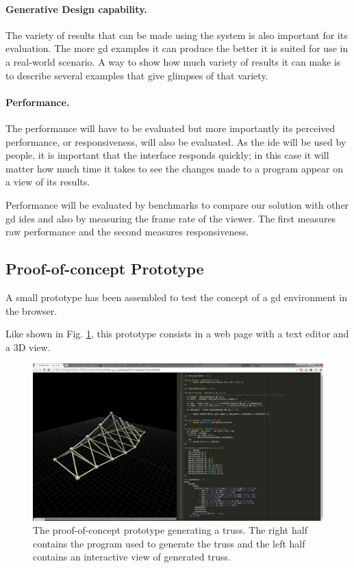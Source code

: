 \documentclass{./llncs2e/llncs}
\begin{document}
	\paragraph{Generative Design capability.}
	The variety of results that can be made using the system is also important for its evaluation.
	The more \ac{gd} examples it can produce the better it is suited for use in a real-world scenario.
	A way to show how much variety of results it can make is to describe several examples that give glimpses of that variety.
	
	\paragraph{Performance.}
	The performance will have to be evaluated but more importantly its perceived performance, or responsiveness, will also be evaluated.
	As the \ac{ide} will be used by people, it is important that the interface responds quickly;
	in this case it will matter how much time it takes to see the changes made to a program appear on a view of its results.
	
	Performance will be evaluated by benchmarks to compare our solution with other \ac{gd} \ac{ide}s and also by measuring the frame rate of the viewer.
	The first measures raw performance and the second measures responsiveness.

\subsection{Proof-of-concept Prototype}
	A small prototype has been assembled to test the concept of a \ac{gd} environment in the browser.

	Like shown in Fig. \ref{fig:proto:3d:p:editor}, this prototype consists in a web page with a text editor and a 3D view.

	\begin{figure}
	  \centering
	  \includegraphics[width=1.0\textwidth]{img/proto_3d_p_editor}
	    \caption{The proof-of-concept prototype generating a truss. The right half contains the program used to generate the truss and the left half contains an interactive view of generated truss.}
	  \label{fig:proto:3d:p:editor}
	\end{figure} 
\end{document}
